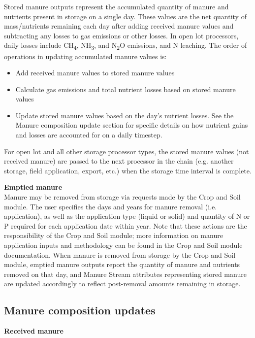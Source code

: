 \begin{refsection}
Stored manure outputs represent the accumulated quantity of manure and nutrients present in storage on a single day. These values are the net quantity of mass/nutrients remaining each day after adding received manure values and subtracting any losses to gas emissions or other losses. In open lot processors, daily losses include CH\textsubscript{4}, NH\textsubscript{3}, and N\textsubscript{2}O emissions, and N leaching. The order of operations in updating accumulated manure values is: 
        \begin{itemize}
            \item Add received manure values to stored manure values
            \item Calculate gas emissions and total nutrient losses based on stored manure values
            \item Update stored manure values based on the day’s nutrient losses. See the Manure composition update section for specific details on how nutrient gains and losses are accounted for on a daily timestep. 
        \end{itemize}
\vspace{0.2cm}

For open lot and all other storage processor types, the stored manure values (not received manure) are passed to the next processor in the chain (e.g. another storage, field application, export, etc.) when the storage time interval is complete. 
\vspace{0.2cm}

\textbf{Emptied manure}\\
Manure may be removed from storage via requests made by the Crop and Soil module. The user specifies the days and years for manure removal (i.e. application), as well as the application type (liquid or solid) and quantity of N or P required for each application date within year. Note that these actions are the responsibility of the Crop and Soil module; more information on manure application inputs and methodology can be found in the Crop and Soil module documentation. When manure is removed from storage by the Crop and Soil module, emptied manure outputs report the quantity of manure and nutrients removed on that day, and Manure Stream attributes representing stored manure are updated accordingly to reflect post-removal amounts remaining in storage.

\vspace{0.2cm}

\subsection{Manure composition updates}
\textbf{Received manure}
\vspace{ 0.25cm}


\end{refsection}
